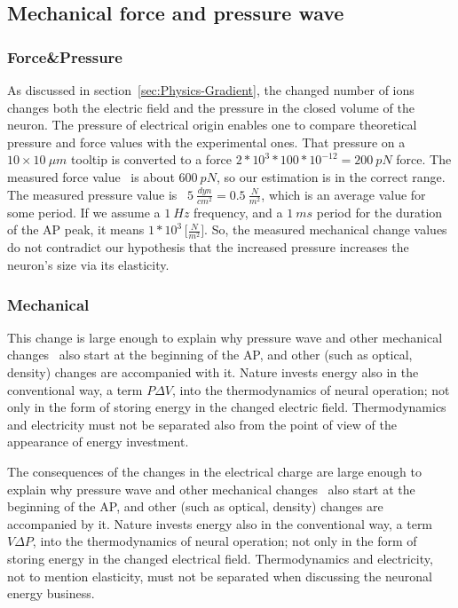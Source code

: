 \subsection[Pressure wave]{Mechanical force and pressure wave\label{sec:Physics-PressureWave}}
\subsubsection{Force\&Pressure\label{sec:Physics-Pressure}}
{As discussed in section~\ref{sec:Physics-Gradient},
the changed number of ions changes both the electric field and the pressure in the closed volume of the neuron. 
The pressure of electrical origin
enables one to compare theoretical pressure and force values
with the experimental ones. 
	That pressure on a $10\times10~\mu m$ tooltip is converted to a force
	$2*10^{3}*100*10^{-12} = 200~pN$ force. The measured force value~\cite{MechanicalPropertiesNerves:2025} is about $600~pN$,
	so our estimation is in the correct range. 
	The measured pressure value is~\cite{PressureChangeActionPotentialMeasured:1980} $5\ \frac{dyn}{cm^2} = 0.5\ \frac{N}{m^2}$, which is an average value
	for some period. If we assume a $1~Hz$ frequency, and a $1~ms$
	period for the duration of the \gls{AP} peak, it means $1*10^{3}\, \bigl[\frac{N}{m^2}\bigr]$.
	So, the measured mechanical change values~\cite{NeuronalDeformation:2020} do not contradict our hypothesis that the increased pressure increases the neuron's size via its elasticity.
}
	
\subsubsection{Mechanical\label{sec:Physics-MechanicalWave}}
 
 This change is large enough to explain why 
 pressure wave and other mechanical changes~\cite{MechanicalWaves:2015} also start at the beginning of the
 \gls{AP},
and other (such as optical, density) changes 
 are accompanied with it. Nature invests energy also 
 in the conventional way, a term $P\Delta V$, into the thermodynamics of neural operation; not only in the form of storing energy in the 
 changed electric field. Thermodynamics and electricity must not be 
 separated also from the point of view of the appearance of energy investment. 
 
 	The consequences of the changes in the electrical charge are large enough to explain why 
	pressure wave and other mechanical changes~\cite{MechanicalWaves:2015} also start at the beginning of the
	\gls{AP},
	and other (such as optical, density) changes 
	are accompanied by it. Nature invests energy also 
	in the conventional way, a term $V\Delta P$, into the thermodynamics of neural operation; not only in the form of storing energy in the 
	changed electrical field. Thermodynamics and electricity, not to mention elasticity, must not be 
	separated when discussing the neuronal energy business. 


